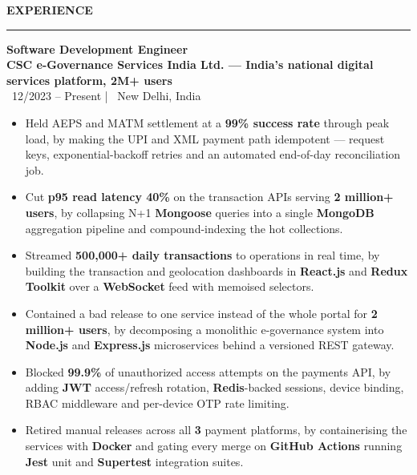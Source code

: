 \documentclass[10pt]{article}
\newcommand{\resumesection}[1]{%
  \vspace{6pt}%
  {\fontfamily{phv}\selectfont\textbf{\large\MakeUppercase{#1}}}%
  \vspace{2pt}%
  \hrule%
  \vspace{4pt}%
}
\begin{document}
\resumesection{Experience}
{\textbf{Software Development Engineer}} \\
{\textbf{\textcolor{primaryblue}{CSC e-Governance Services India Ltd. --- India's national digital services platform, 2M+ users}}} \\
{\footnotesize\textcolor{primaryblue}{\faCalendar*}~12/2023 -- Present \quad | \quad \textcolor{primaryblue}{\faMapMarker*}~New Delhi, India}
\begin{itemize}
    \item Held AEPS and MATM settlement at a \textbf{99\% success rate} through peak load, by making the UPI and XML payment path idempotent --- request keys, exponential-backoff retries and an automated end-of-day reconciliation job.
    \item Cut \textbf{p95 read latency 40\%} on the transaction APIs serving \textbf{2 million+ users}, by collapsing N+1 \textbf{Mongoose} queries into a single \textbf{MongoDB} aggregation pipeline and compound-indexing the hot collections.
    \item Streamed \textbf{500,000+ daily transactions} to operations in real time, by building the transaction and geolocation dashboards in \textbf{React.js} and \textbf{Redux Toolkit} over a \textbf{WebSocket} feed with memoised selectors.
    \item Contained a bad release to one service instead of the whole portal for \textbf{2 million+ users}, by decomposing a monolithic e-governance system into \textbf{Node.js} and \textbf{Express.js} microservices behind a versioned REST gateway.
    \item Blocked \textbf{99.9\%} of unauthorized access attempts on the payments API, by adding \textbf{JWT} access/refresh rotation, \textbf{Redis}-backed sessions, device binding, RBAC middleware and per-device OTP rate limiting.
    \item Retired manual releases across all \textbf{3} payment platforms, by containerising the services with \textbf{Docker} and gating every merge on \textbf{GitHub Actions} running \textbf{Jest} unit and \textbf{Supertest} integration suites.
\end{itemize}
\end{document}
